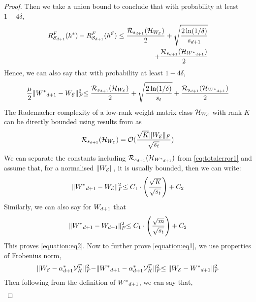 \begin{theorem}
\begin{proof}
    Then we take a union bound to conclude that with probability at least $1-4\delta$,
    \begin{align*}
        R_{\mathcal{S}_{d+1}}^F(h^{*}) - R_{\mathcal{S}_{d+1}}^F(h^{\mathcal{E}}) \leq \frac{\mathcal{R}_{s_{d+1}}(\mathcal{H}_{W_{\mathcal{E}}})}{2} + \sqrt{\frac{2\ln(1/\delta)}{s_{d+1}}}\\ 
        + \frac{\mathcal{R}_{s_{d+1}}(\mathcal{H}_{{W^*}_{d+1}})}{2}
    \end{align*}
    Hence, we can also say that with probability at least $1-4\delta$,
    \begin{equation}
    \label{eq:totalerror1}
        \frac{\mu}{2}\lVert{W^*}_{d+1} - W_{\mathcal{E}}\lVert^2_F
        \leq \frac{\mathcal{R}_{s_{d+1}}(\mathcal{H}_{W_{\mathcal{E}}})}{2} + \sqrt{\frac{2\ln(1/\delta)}{s_t}} + \frac{\mathcal{R}_{s_{d+1}}(\mathcal{H}_{{W^*}_{d+1}})}{2}
    \end{equation}
    The Rademacher complexity of a low-rank weight matrix class $\mathcal{H}_{W_{\mathcal{E}}}$ with rank $K$ can be directly bounded using results from \cite{bartlett2003rademacher} as
    \begin{align*}
        \mathcal{R}_{s_{d+1}}(\mathcal{H}_{W_{\mathcal{E}}}) &= \mathcal{O}(\frac{\sqrt{K}\lVert W_{\mathcal{E}} \lVert_F}{\sqrt{s_t}})\\ 
    \end{align*}
    We can separate the constants including $\mathcal{R}_{s_{d+1}}(\mathcal{H}_{{W^*}_{d+1}})$ from \ref{eq:totalerror1} and assume that, for a normalised $\lVert W_{\mathcal{E}}\lVert$, it is usually bounded, then we can write:
    \begin{equation}
    \label{eq:totalerror2}
         \lVert{W^*}_{d+1} - W_{\mathcal{E}}\lVert^2_F
        \leq C_1\cdot \Bigg(\frac{\sqrt{K}}{\sqrt{s_t}} \Bigg) + C_2
    \end{equation}
    Similarly, we can also say for $W_{d+1}$ that
    \begin{equation}
    \label{eq:totalerror}
        \lVert{W^*}_{d+1} - W_{d+1}\lVert^2_F
        \leq C_1\cdot\Bigg(\frac{\sqrt{m}}{\sqrt{s_t}}\Bigg) + C_2
    \end{equation}
    This proves \ref{equation:eq2}. Now to further prove \ref{equation:eq1}, we use  properties of Frobenius norm,
    \begin{align*}
        \lVert W_{\mathcal{E}} - \alpha^{*}_{d+1}\mathcal{V}^T_{K} \lVert^2_F - \lVert {W^*}_{d+1} - \alpha^{*}_{d+1}\mathcal{V}^T_{K} \lVert^2_F \leq \Vert W_{\mathcal{E}} - {W^*}_{d+1}\lVert^2_F
    \end{align*}
    Then following from the definition of ${W^*}_{d+1}$, we can say that,
    \begin{align*}

\end{align*}
\end{proof}
\end{theorem}
